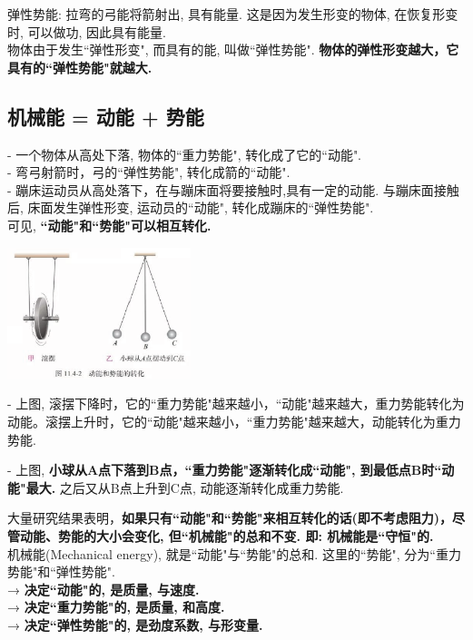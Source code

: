 \documentclass[UTF8]{ctexart}
\begin{document}
	弹性势能: 拉弯的弓能将箭射出, 具有能量. 这是因为发生形变的物体, 在恢复形变时, 可以做功, 因此具有能量.  \\
	物体由于发生``弹性形变", 而具有的能, 叫做``弹性势能". \textbf{物体的弹性形变越大，它具有的``弹性势能"就越大.}
	
	
	\vspace{1em} 
	
	
	
	\subsection{机械能 = 动能 + 势能}
	
	- 一个物体从高处下落, 物体的``重力势能", 转化成了它的``动能". \\
	- 弯弓射箭时，弓的``弹性势能", 转化成箭的``动能". \\
	- 蹦床运动员从高处落下，在与蹦床面将要接触时,具有一定的动能. 与蹦床面接触后, 床面发生弹性形变, 运动员的``动能", 转化成蹦床的``弹性势能". \\
	可见, \textbf{``动能"和``势能"可以相互转化.} \\
	
	\begin{tcolorbox}[title = {例},boxrule={0.1em},colframe={black!10}, colback={black!3},colbacktitle={black!10},coltitle={black}]
	\includegraphics[width=0.4\textwidth]{img/0046.png}
	
	- 上图, 滚摆下降时，它的``重力势能"越来越小，``动能"越来越大，重力势能转化为动能。滚摆上升时，它的``动能"越来越小，``重力势能"越来越大，动能转化为重力势能.
	
	- 上图, \textbf{小球从A点下落到B点，``重力势能"逐渐转化成``动能", 到最低点B时``动能"最大.} 之后又从B点上升到C点, 动能逐渐转化成重力势能.	
	\end{tcolorbox}

	大量研究结果表明，\textbf{如果只有``动能"和``势能"来相互转化的话(即不考虑阻力)，尽管动能、势能的大小会变化, 但``机械能"的总和不变. 即: 机械能是``守恒"的.} \\
	
	
	机械能(Mechanical energy), 就是``动能"与``势能"的总和. 这里的``势能", 分为``重力势能"和``弹性势能".  \\
	→ \textbf{决定``动能"的, 是质量, 与速度.} \\
	→ \textbf{决定``重力势能"的, 是质量, 和高度.} \\
	→ \textbf{决定``弹性势能"的, 是劲度系数, 与形变量.} \\
	
\end{document}
